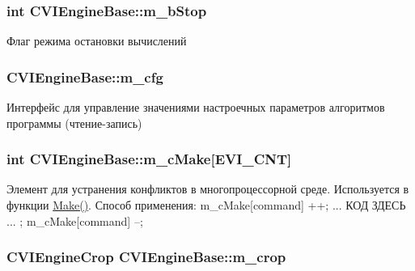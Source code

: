 \hypertarget{class_c_v_i_engine_base_a13cd33209e328eed98e79086439748b2}{
\subsubsection[{m\+\_\+b\+Stop}]{\setlength{\rightskip}{0pt plus 5cm}int C\+V\+I\+Engine\+Base\+::m\+\_\+b\+Stop}}\label{class_c_v_i_engine_base_a13cd33209e328eed98e79086439748b2}


Флаг режима остановки вычислений 

\hypertarget{class_c_v_i_engine_base_a867f7342010985b0b21beb4feaf354b8}{
\subsubsection[{m\+\_\+cfg}]{ C\+V\+I\+Engine\+Base\+::m\+\_\+cfg}}\label{class_c_v_i_engine_base_a867f7342010985b0b21beb4feaf354b8}


Интерфейс для управление значениями настроечных параметров алгоритмов программы (чтение-\/запись) 

\hypertarget{class_c_v_i_engine_base_a2c62f336b24d613e0320d2e6f676b89b}{
\subsubsection[{m\+\_\+c\+Make}]{\setlength{\rightskip}{0pt plus 5cm}int C\+V\+I\+Engine\+Base\+::m\+\_\+c\+Make\mbox{[}E\+V\+I\+\_\+\+C\+N\+T\mbox{]}}}\label{class_c_v_i_engine_base_a2c62f336b24d613e0320d2e6f676b89b}


Элемент для устранения конфликтов в многопроцессорной среде. Используется в функции \hyperlink{class_c_v_i_engine_base_aa59b55fc315394f4c19cb7d95c399913}{Make()}. Способ применения\+: m\+\_\+c\+Make\mbox{[}command\mbox{]} ++; ... КОД ЗДЕСЬ ... ; m\+\_\+c\+Make\mbox{[}command\mbox{]} --; 

\hypertarget{class_c_v_i_engine_base_a914dcdad5bb4fa5d7c0363122aa5fa0b}{
\subsubsection[{m\+\_\+crop}]{\setlength{\rightskip}{0pt plus 5cm}C\+V\+I\+Engine\+Crop C\+V\+I\+Engine\+Base\+::m\+\_\+crop}}\label{class_c_v_i_engine_base_a914dcdad5bb4fa5d7c0363122aa5fa0b}


